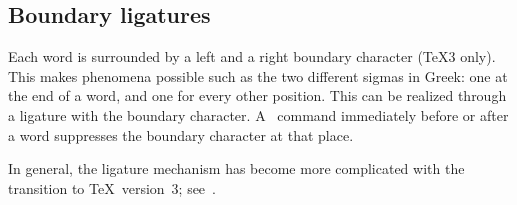 \documentclass{book}
\begin{document}
\subsection{Boundary ligatures}

Each word is surrounded by a left and a right
boundary character (\TeX3 only).
This makes phenomena possible
such as the two different sigmas in Greek:
one at the end of a word, and one for every other position.
This can be realized through a ligature with the
boundary character. A~ command immediately
before or after a word suppresses the boundary character
at that place.

In general, the ligature mechanism has become more complicated
with the transition to \TeX\ version~3; see~\cite{K:TeX23}.

\endofchapter
\end{document}

